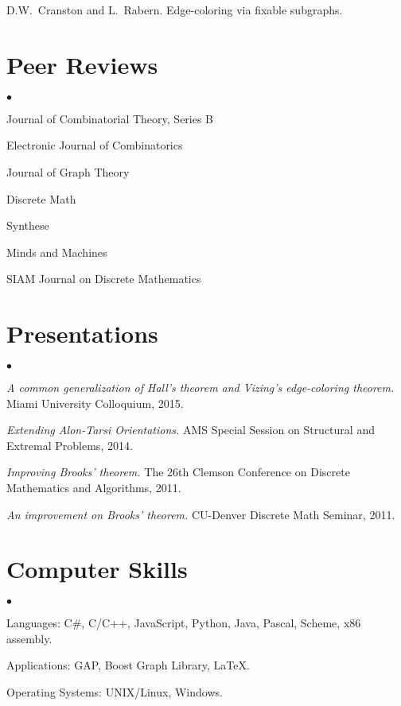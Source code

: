 \documentclass[margin,line]{res}
\newenvironment{list2}{
  \begin{list}{$\bullet$}{%
      \setlength{\itemsep}{0in}
      \setlength{\parsep}{0in} \setlength{\parskip}{0in}
      \setlength{\topsep}{0in} \setlength{\partopsep}{0in} 
      \setlength{\leftmargin}{0.2in}}}{\end{list}}
\begin{document}
\begin{resume}
\begin{enumerate}[{[}1{]}]
\smallskip

\item
D.W.~Cranston and L.~Rabern.
\newblock Edge-coloring via fixable subgraphs.


\end{enumerate}

\section{\sc Peer Reviews}
\begin{list2}
\item Journal of Combinatorial Theory, Series B
\item Electronic Journal of Combinatorics
\item Journal of Graph Theory
\item Discrete Math
\item Synthese
\item Minds and Machines
\item SIAM Journal on Discrete Mathematics
\end{list2}

\section{\sc Presentations}
\begin{list2}
\item \emph{A common generalization of Hall's theorem and Vizing's edge-coloring theorem.} Miami University Colloquium, 2015.
\item \emph{Extending Alon-Tarsi Orientations.} AMS Special Session on Structural and Extremal Problems, 2014.
\item \emph{Improving Brooks' theorem.} The 26th Clemson Conference on Discrete Mathematics and Algorithms, 2011.
\item \emph{An improvement on Brooks' theorem.} CU-Denver Discrete Math Seminar, 2011.
\end{list2}

\section{\sc Computer Skills} 
\begin{list2}
\item Languages: C\#, C/C++, JavaScript, Python, Java, Pascal, Scheme, x86 assembly.
\item Applications: GAP, Boost Graph Library, \LaTeX.
\item Operating Systems:  UNIX/Linux, Windows.
\end{list2}

\end{resume}
\end{document}
